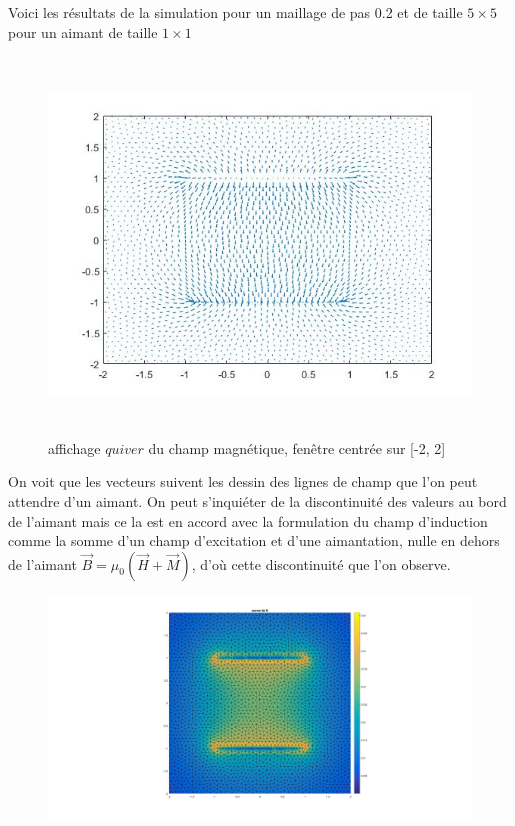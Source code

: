 \documentclass[a4paper,12pt,titlepage]{report}
\begin{document}
\begin{onehalfspace}
Voici les résultats de la simulation pour un maillage de pas 0.2 et de taille $5 \times 5$ pour un aimant de taille $1 \times 1$
\begin{figure}[!h]
\begin{center}
\includegraphics[height = 10cm, keepaspectratio]{graphes/resultat_champ.jpg}
\caption{affichage $quiver$ du champ magnétique, fenêtre centrée sur [-2, 2]}
\label{figure 1}
\end{center}
\end{figure}
On voit que les vecteurs suivent les dessin des lignes de champ que l'on peut attendre d'un aimant.
On peut s'inquiéter de la discontinuité des valeurs au bord de l'aimant mais ce la est en accord avec la formulation du champ d'induction comme la somme d'un champ d'excitation et d'une aimantation, nulle en dehors de l'aimant $\vec{B}=\mu _{0}(\vec{H}+\vec{M})$, d'où cette discontinuité que l'on observe.
\begin{figure}[!h]
\begin{center}
\includegraphics[height = 8 cm, keepaspectratio]{graphes/norme_du_champ.jpg}

\end{center}
\end{figure}
\end{onehalfspace}
\end{document}
